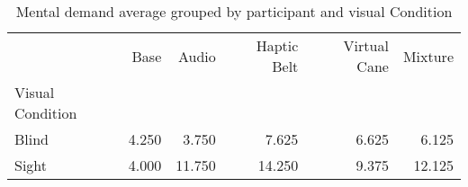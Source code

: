 
\begin{table}[!htb]
\centering
\caption{Mental demand average grouped by participant and visual Condition}
\label{tab:md_average_group}
\begin{tabular}{lrrrrr}
\toprule
{} &  Base &  Audio &  Haptic Belt &  Virtual Cane &  Mixture \\
Visual Condition &       &        &              &               &          \\
\midrule
Blind            & 4.250 &  3.750 &        7.625 &         6.625 &    6.125 \\
Sight            & 4.000 & 11.750 &       14.250 &         9.375 &   12.125 \\
\bottomrule
\end{tabular}
\end{table}

